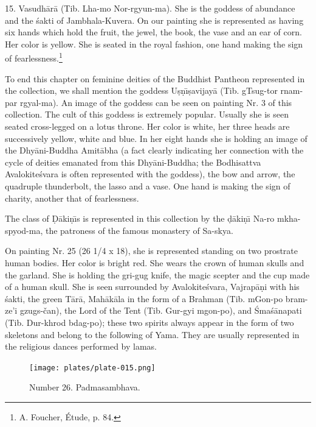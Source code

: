 \documentclass[a4paper, 12pt, oneside]{article}
\begin{document}
15. Vasudh\={a}r\={a} (Tib. Lha-mo Nor-rgyun-ma). She is the goddess of abundance and the \'{s}akti of Jambhala-Kuvera. On our painting she is represented as having six hands which hold the fruit, the jewel, the book, the vase and an ear of corn. Her color is yellow. She is seated in the royal fashion, one hand making the sign of fearlessness.\footnote{A. Foucher, Étude, p. 84.}

To end this chapter on feminine deities of the Buddhist Pantheon represented in the collection, we shall mention the goddess U\d{s}\d{n}\={\i}\d{s}avijay\={a} (Tib. gTsug-tor rnam-par rgyal-ma). An image of the goddess can be seen on painting Nr. 3 of this collection. The cult of this goddess is extremely popular. Usually she is seen seated cross-legged on a lotus throne. Her color is white, her three heads are successively yellow, white and blue. In her eight hands she is holding an image of the Dhy\={a}ni-Buddha Amit\={a}bha (a fact clearly indicating her connection with the cycle of deities emanated from this Dhy\={a}ni-Buddha; the Bodhisattva Avalokite\'{s}vara is often represented with the goddess), the bow and arrow, the quadruple thunderbolt, the lasso and a vase. One hand is making the sign of charity, another that of fearlessness.

The class of \d{D}\={a}ki\d{n}\={\i}s is represented in this collection by the \d{d}\={a}ki\d{n}\={\i} Na-ro mkha-spyod-ma, the patroness of the famous monastery of Sa-skya.

\bigskip

On painting Nr. 25 (26 1/4 x 18), she is represented standing on two prostrate human bodies. Her color is bright red. She wears the crown of human skulls and the garland. She is holding the gri-gug knife, the magic scepter and the cup made of a human skull. She is seen surrounded by Avalokite\'{s}vara, Vajrap\={a}\d{n}i with his \'{s}akti, the green T\={a}r\={a}, Mah\={a}k\={a}la in the form of a Brahman (Tib. mGon-po bram-ze'i gzugs-čan), the Lord of the Tent (Tib. Gur-gyi mgon-po), and \'{S}ma\'{s}\={a}napati (Tib. Dur-khrod bdag-po); these two spirits always appear in the form of two skeletons and belong to the following of Yama. They are usually represented in the religious dances performed by lamas.
\clearpage
\vspace*{\fill}
\begin{figure}[H]
\centering
\texttt{[image: plates/plate-015.png]}
\caption*{Number 26. Padmasambhava.}
\end{figure}
\vspace*{\fill}
\clearpage
\end{document}
